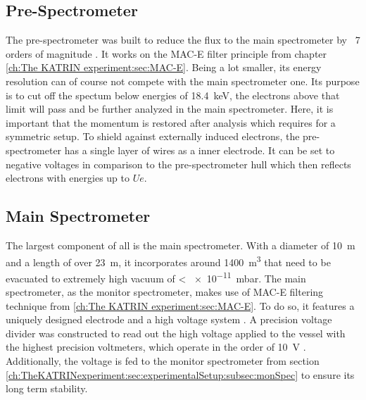       \subsection{Pre-Spectrometer}
      \label{ch:The KATRIN experiment:sec:Experimental setup:subsec:PreSpectrometer}
      The pre-spectrometer was built to reduce the flux to the main spectrometer by ~7 orders of magnitude \cite{statusPSWolf}. It works on the MAC-E filter principle from chapter \ref{ch:The KATRIN experiment:sec:MAC-E}. Being a lot smaller, its energy resolution can of course not compete with the main spectrometer one. Its purpose is to cut off the spectum below energies of \SI{18.4}{\kilo\electronvolt}, the electrons above that limit will pass and be further analyzed in the main spectrometer. Here, it is important that the momentum is restored after analysis which requires for a symmetric setup. To shield against externally induced electrons, the pre-spectrometer has a single layer of wires as a inner electrode. It can be set to negative voltages in comparison to the pre-spectrometer hull which then reflects electrons with energies up to $Ue$.
      
      \subsection{Main Spectrometer}
      \label{ch:The KATRIN experiment:sec:Experimental setup:subsec:MainSpec}
      The largest component of all is the main spectrometer. With a diameter of \SI{10}{\meter} and a length of over \SI{23}{\meter}, it incorporates around \SI{1400}{\cubic\meter} that need to be evacuated to extremely high vacuum of < \SI{e-11}{\milli\bar}. The main spectrometer, as the monitor spectrometer, makes use of MAC-E filtering technique from \ref{ch:The KATRIN experiment:sec:MAC-E}. To do so, it features a uniquely designed electrode and a high voltage system \cite{mainSpecElectrodeDesign}. A precision voltage divider was constructed to read out the high voltage applied to the vessel with the highest precision voltmeters, which operate in the order of \SI{10}{\volt} \cite{highVoltageDivider}. Additionally, the voltage is fed to the monitor spectrometer from section \ref{ch:TheKATRINexperiment:sec:experimentalSetup:subsec:monSpec} to ensure its long term stability.
      
